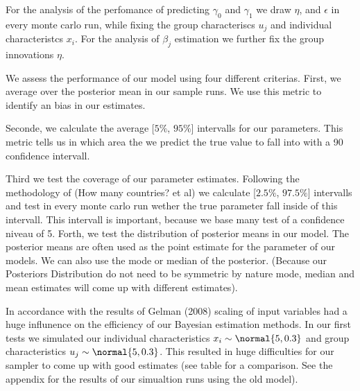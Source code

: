 For the analysis of the perfomance of predicting $\gamma_0$ and $\gamma_1$ we draw $\eta$, and $\epsilon$ in every monte carlo run, while fixing the group characteriscs $u_j$ and individual characteristcs $x_i$. 
For the analysis of $\beta_j$ estimation we further fix the group innovations $\eta$.

We assess the performance of our model using four different criterias. First, we average over the posterior mean in our sample runs. We use this metric to identify an bias in our estimates. 

Seconde, we calculate the average [$5\text{\%}$, $95\text{\%}$] intervalls for our parameters. This metric tells us in which area the we predict the true value to fall into with a 90\text{\%} confidence intervall. 

Third we test the coverage of our parameter estimates. Following the methodology of (How many countries? et al) we calculate  [$2.5\text{\%}$, $97.5\text{\%}$] intervalls and test in every monte carlo run wether the true parameter fall inside of this intervall.
This intervall is important, because we base many test of a confidence niveau of 5\text{\%}. Forth, we test the distribution of posterior means in our model. The posterior means are often used as the point estimate for the parameter of our models. We can also use the mode or median of the posterior. (Because our Posteriors Distribution do not need to be symmetric by nature mode, median and mean estimates will come up with different estimates).

In accordance with the results of Gelman (2008) scaling of input variables had a huge influnence on the efficiency of our Bayesian estimation methods. In our first tests we simulated our individual characteristics $x_i\sim\normal{5,0.3}$ and group characteristics $u_j\sim\normal{5,0.3}$. This resulted in huge difficulties for our sampler to come up with good estimates (see table for a comparison. See the appendix for the results of our simualtion runs using the old model).


